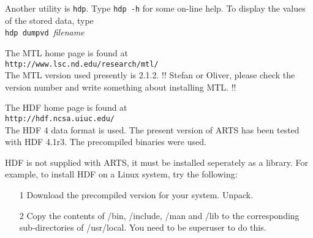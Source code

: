  Another utility is \verb|hdp|. Type \verb|hdp -h| for some on-line help.
 To display the values of the stored data, type\\
 
 \verb|hdp dumpvd |{\it filename}



 \label{sec:formats:mtl}

 The MTL home page is found at \\

 \verb|http://www.lsc.nd.edu/research/mtl/| \\

 \noindent
 The MTL version used presently is 2.1.2. !! Stefan or Oliver, please check
 the version number and write something about installing MTL. !!


 \label{sec:formats:hdf}

 The HDF home page is found at \\

 \verb|http://hdf.ncsa.uiuc.edu/| \\

 \noindent
 The HDF 4 data format is used. The present version of ARTS has been
 tested with HDF 4.1r3. The precompiled binaries were used.
 
 HDF is not supplied with ARTS, it must be installed seperately as a
 library. For example, to install HDF on a Linux system, try the
 following:
 \begin{itemize}
  \item[1] Download the precompiled version for your system. Unpack.
  \item[2] Copy the contents of /bin, /include, /man and /lib to the 
           corresponding sub-directories of /usr/local. You need to be 
           superuser to do this.  
 \end{itemize}



